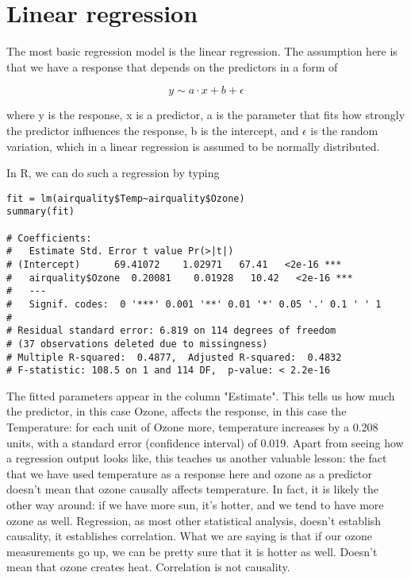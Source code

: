 \documentclass[a4paper,twoside]{tufte-book} %
\begin{document}
\section{Linear regression}

The most basic regression model is the linear regression. The assumption here is that we have a response that depends on the predictors in a form of 

\begin{equation} \label{eq: linear regression}
y \sim a \cdot x + b + \epsilon 
\end{equation}

where y is the response, x is a predictor, a is the parameter that fits how strongly the predictor influences the response, b is the intercept, and $\epsilon$ is the random variation, which in a linear regression is assumed to be normally distributed. 

In R, we can do such a regression by typing

\begin{lstlisting}
fit = lm(airquality$Temp~airquality$Ozone)
summary(fit)

# Coefficients:
#   Estimate Std. Error t value Pr(>|t|)    
# (Intercept)      69.41072    1.02971   67.41   <2e-16 ***
#   airquality$Ozone  0.20081    0.01928   10.42   <2e-16 ***
#   ---
#   Signif. codes:  0 '***' 0.001 '**' 0.01 '*' 0.05 '.' 0.1 ' ' 1
# 
# Residual standard error: 6.819 on 114 degrees of freedom
# (37 observations deleted due to missingness)
# Multiple R-squared:  0.4877,  Adjusted R-squared:  0.4832 
# F-statistic: 108.5 on 1 and 114 DF,  p-value: < 2.2e-16
\end{lstlisting}

The fitted parameters appear in the column "Estimate". This tells us how much the predictor, in this case Ozone, affects the response, in this case the Temperature: for each unit of Ozone more, temperature increases by a 0.208 units, with a standard error (confidence interval) of 0.019. Apart from seeing how a regression output looks like, this teaches us another valuable lesson: the fact that we have used temperature as a response here and ozone as a predictor doesn't mean that ozone causally affects temperature.  In fact, it is likely the other way around: if we have more sun, it's hotter, and we tend to have more ozone as well. Regression, as most other statistical analysis, doesn't establish causality, it establishes correlation. What we are saying is that if our ozone measurements go up, we can be pretty sure that it is hotter as well. Doesn't mean that ozone creates heat. Correlation is not causality. 
\end{document}

